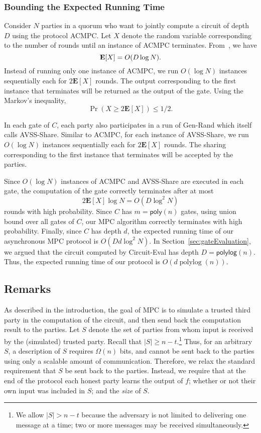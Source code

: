 \documentclass[11pt,letter]{article}
\newcommand{\alg}[1]{\mbox{\textsf{#1}}}
\DeclareMathOperator{\polylog}{polylog}
\theoremstyle{mytheoremstyle}
\begin{document}
\subsubsection{Bounding the Expected Running Time} \label{sec:runtime}
Consider $N$ parties in a quorum who want to jointly compute a circuit of depth $D$ using the protocol \alg{ACMPC}. Let $X$ denote the random variable corresponding to the number of rounds until an instance of \alg{ACMPC} terminates. From~\cite{benor_canetti_goldreich:asynchronous}, we have \[\centering \mathbf{E}[X] = O(D\log{N}).\] Instead of running only one instance of \alg{ACMPC}, we run $O(\log{N})$ instances sequentially each for $2\mathbf{E}[X]$ rounds. The output corresponding to the first instance that terminates will be returned as the output of the gate. Using the Markov's inequality, \[\Pr(X \geq 2\mathbf {E}[X]) \leq 1/2.\] 

In each gate of $C$, each party also participates in a run of \alg{Gen-Rand} which itself calls \alg{AVSS-Share}. Similar to \alg{ACMPC}, for each instance of \alg{AVSS-Share}, we run $O(\log{N})$ instances sequentially each for $2\mathbf{E}[X]$ rounds. The sharing corresponding to the first instance that terminates will be accepted by the parties.

Since $O(\log{N})$ instances of \alg{ACMPC} and \alg{AVSS-Share} are executed in each gate, the computation of the gate correctly terminates after at most \[2\mathbf{E}[X]\log{N} = O(D\log^2{N})\] rounds with high probability.
Since $C$ has $m = \mathsf{poly}(n)$ gates, using union bound over all gates of $C$, our MPC algorithm correctly terminates with high probability. Finally, since $C$ has depth $d$, the expected running time of our asynchronous MPC protocol is $O(Dd\log^2{N})$. In Section~\ref{sec:gateEvaluation}, we argued that the circuit computed by \alg{Circuit-Eval} has depth $D = \mathsf{polylog}(n)$. Thus, the expected running time of our protocol is $O(d \polylog(n))$.


\subsection{Remarks}
\label{sec:dis}
As described in the introduction, the goal of MPC is to simulate a trusted third party in the computation of the circuit, and then send back the computation result to the parties. Let $S$ denote the set of parties from whom input is received by the (simulated) trusted party. Recall that $|S| \ge n-t$.\footnote{We allow $|S| > n-t$ because the adversary is not limited to delivering one message at a time; two or more messages may be received simultaneously.}
Thus, for an arbitrary $S$, a description of $S$ requires $\Omega(n)$ bits, and cannot be sent back to the parties using only a scalable amount of communication. Therefore, we relax the standard requirement that $S$ be sent back to the parties. Instead, we require that at the end of the protocol each honest party learns the output of $f$; whether or not their own input was included in $S$; and the \emph{size} of $S$.
\end{document}
